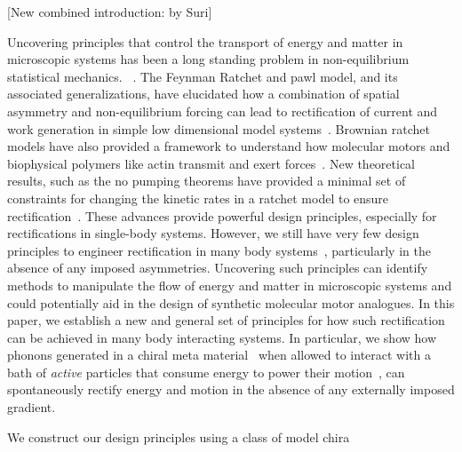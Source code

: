 \documentclass[
 preprint,
 preprintnumbers,
 amsmath,amssymb,
 aps,
 pre,
 longbibliography,
 superscriptaddress,
 10pt, twocolumn
]{revtex4-1}
\begin{document}
[New combined introduction: by Suri] 

Uncovering principles that control the transport of energy and matter in microscopic systems has been a long standing problem in non-equilibrium statistical mechanics. ~\cite{Seifert2012StochasticThermodynamics,Coskun2011GreatExpectations}. The Feynman Ratchet and pawl model, and its associated generalizations, have elucidated how a combination of spatial asymmetry and non-equilibrium forcing can lead to rectification of current and work generation in simple low dimensional model systems~\cite{Jarzynski1999FeynmanRatchet}. Brownian ratchet models have also provided a framework to understand how molecular motors and biophysical polymers like actin transmit and exert forces~\cite{Mogilner1996CellMotility}. New theoretical results, such as the no pumping theorems have provided a minimal set of constraints for changing the kinetic rates in a ratchet model to ensure rectification~\cite{Chernyak2008PumpingRestriction,Rahav2008DirectedFlow,Sinitsyn2007UniversalGeometric}.
These advances provide powerful design principles, especially for rectifications in single-body systems.
However, we still have very few design principles to engineer rectification in many body systems~\cite{Seifert2012StochasticThermodynamics}, particularly in the absence of any imposed asymmetries. Uncovering such principles can identify methods to manipulate the flow of energy and matter in microscopic systems and could potentially aid in the design of synthetic molecular motor analogues. In this paper, we establish a new and general set of principles for how such rectification can be achieved in many body interacting systems. In particular, we show how phonons generated in a chiral meta material~\cite{Nash2015TopologicalMechanics} when allowed to interact with a bath of \textit{active} particles that consume energy to power their motion~\cite{Marchetti2013HydrodynamicsSoft,Souslov2017TopologicalSound,Shankar2017TopologicalSound}, can spontaneously rectify energy and motion in the absence of any externally imposed gradient. 


We construct our design principles using a class of model chira
\end{document}
